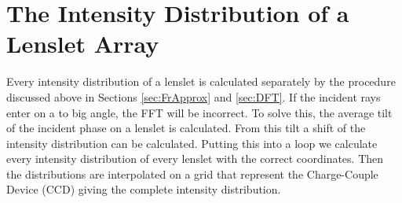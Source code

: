 \section{The Intensity Distribution of a Lenslet Array}
Every intensity distribution of a lenslet is calculated separately by the procedure discussed above in Sections \ref{sec:FrApprox} and \ref{sec:DFT}.
If the incident rays enter on a to big angle, the FFT will be incorrect. To solve this, the average tilt of the incident phase on a lenslet is calculated. From this tilt a shift of the intensity distribution can be calculated. Putting this into a loop we calculate every intensity distribution of every lenslet with the correct coordinates. Then the distributions are interpolated on a grid that represent the Charge-Couple Device (CCD) giving the complete intensity distribution. 